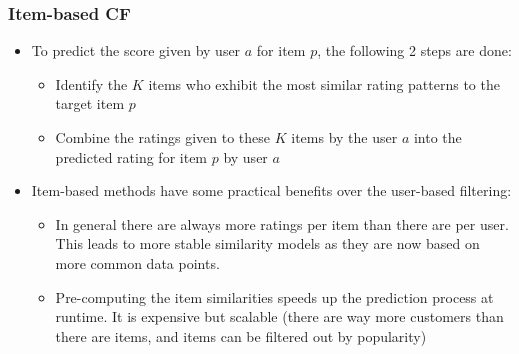\documentclass{article}
\begin{document}
\subsubsection{Item-based CF}
\begin{itemize}
     \item To predict the score given by user $a$ for item $p$, the following 2 steps are done:
    \begin{itemize}
        \item Identify the $K$ items who exhibit the most similar rating patterns to the target item $p$
        
        \item Combine the ratings given to these $K$ items by the user $a$ into the predicted rating for item $p$ by user $a$
    \end{itemize}
    
    \item Item-based methods have some practical benefits over the user-based filtering:
    \begin{itemize}
        \item In general there are always more ratings per item than there are per user. This leads to more stable similarity models as they are now based on more common data points.
        
        \item Pre-computing the item similarities speeds up the prediction process at runtime. It is expensive but scalable (there are way more customers than there are items, and items can be filtered out by popularity) 
    \end{itemize}
\end{itemize}
\end{document}
